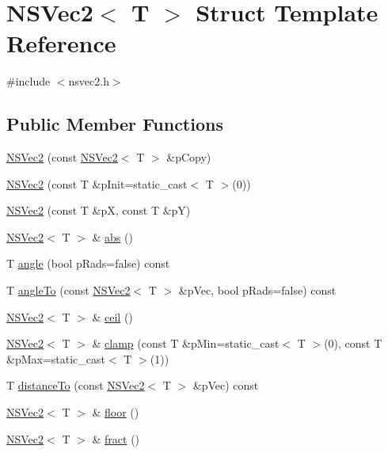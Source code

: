 \hypertarget{structNSVec2}{\section{N\-S\-Vec2$<$ T $>$ Struct Template Reference}
\label{structNSVec2}
}


{\ttfamily \#include $<$nsvec2.\-h$>$}

\subsection*{Public Member Functions}
\begin{DoxyCompactItemize}
\item 
\hyperlink{structNSVec2_aba39f99d2f7f126f02512e813440e6fb}{N\-S\-Vec2} (const \hyperlink{structNSVec2}{N\-S\-Vec2}$<$ T $>$ \&p\-Copy)
\item 
\hyperlink{structNSVec2_a723d1616a053702d63341f752ac1cd16}{N\-S\-Vec2} (const T \&p\-Init=static\-\_\-cast$<$ T $>$(0))
\item 
\hyperlink{structNSVec2_a912fe4d0af0ab01f062e880d553da560}{N\-S\-Vec2} (const T \&p\-X, const T \&p\-Y)
\item 
\hyperlink{structNSVec2}{N\-S\-Vec2}$<$ T $>$ \& \hyperlink{structNSVec2_ad6375c930b5c0fa261ab6f28054e8772}{abs} ()
\item 
T \hyperlink{structNSVec2_a845b9ef0c25e48729d7309d7303f0ff0}{angle} (bool p\-Rads=false) const 
\item 
T \hyperlink{structNSVec2_add93ec4119c90a70bb51610110b6578b}{angle\-To} (const \hyperlink{structNSVec2}{N\-S\-Vec2}$<$ T $>$ \&p\-Vec, bool p\-Rads=false) const 
\item 
\hyperlink{structNSVec2}{N\-S\-Vec2}$<$ T $>$ \& \hyperlink{structNSVec2_a233463b6f7491a9c528598b45e3cec9e}{ceil} ()
\item 
\hyperlink{structNSVec2}{N\-S\-Vec2}$<$ T $>$ \& \hyperlink{structNSVec2_ad51aa1f5ec4e65904cc4299d18005058}{clamp} (const T \&p\-Min=static\-\_\-cast$<$ T $>$(0), const T \&p\-Max=static\-\_\-cast$<$ T $>$(1))
\item 
T \hyperlink{structNSVec2_aba94e99d202ba1dbc979794bd4529b8a}{distance\-To} (const \hyperlink{structNSVec2}{N\-S\-Vec2}$<$ T $>$ \&p\-Vec) const 
\item 
\hyperlink{structNSVec2}{N\-S\-Vec2}$<$ T $>$ \& \hyperlink{structNSVec2_ab0df03d6df50d32884eece3ca5ce1664}{floor} ()
\item 
\hyperlink{structNSVec2}{N\-S\-Vec2}$<$ T $>$ \& \hyperlink{structNSVec2_ad09449f910b1f6eafcde676824f404da}{fract} ()

\end{DoxyCompactItemize}
